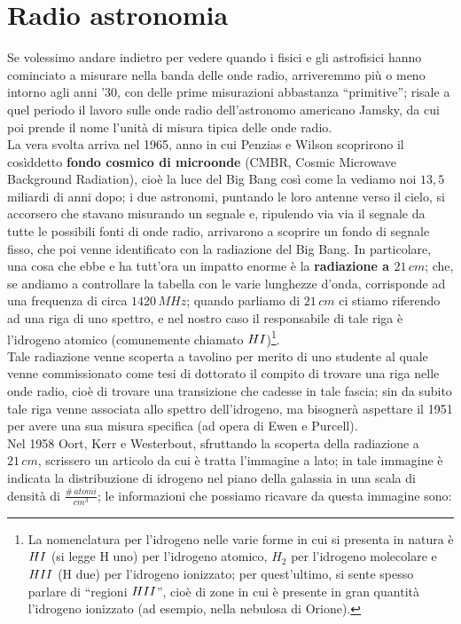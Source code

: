 \section{Radio astronomia}
Se volessimo andare indietro per vedere quando i fisici e gli astrofisici hanno cominciato a misurare nella banda delle onde radio, arriveremmo più o meno intorno agli anni '30, con delle prime misurazioni abbastanza ``primitive''; risale a quel periodo il lavoro sulle onde radio dell'astronomo americano Jamsky, da cui poi prende il nome l'unità di misura tipica delle onde radio.\\
La vera svolta arriva nel 1965, anno in cui Penzias e Wilson scoprirono il cosìddetto \textbf{fondo cosmico di microonde} (CMBR, Cosmic Microwave Background Radiation), cioè la luce del Big Bang così come la vediamo noi $13,5$ miliardi di anni dopo; i due astronomi, puntando le loro antenne verso il cielo, si accorsero che stavano misurando un segnale e, ripulendo via via il segnale da tutte le possibili fonti di onde radio, arrivarono a scoprire un fondo di segnale fisso, che poi venne identificato con la radiazione del Big Bang. In particolare, una cosa che ebbe e ha tutt'ora un impatto enorme è la \textbf{radiazione a $21 \, cm$}; che, se andiamo a controllare la tabella con le varie lunghezze d'onda, corrisponde ad una frequenza di circa $1420 \, MHz$; quando parliamo di $21 \, cm$ ci stiamo riferendo ad una riga di uno spettro, e nel nostro caso il responsabile di tale riga è l'idrogeno atomico (comunemente chiamato $H \RNum{1}$)\footnote{La nomenclatura per l'idrogeno nelle varie forme in cui si presenta in natura è $H \RNum{1}$ (si legge H uno) per l'idrogeno atomico, $H_2$ per l'idrogeno molecolare e $H \RNum{2}$ (H due) per l'idrogeno ionizzato; per quest'ultimo, si sente spesso parlare di ``regioni $H \RNum{2}$'', cioè di zone in cui è presente in gran quantità l'idrogeno ionizzato (ad esempio, nella nebulosa di Orione).}.\\
Tale radiazione venne scoperta a tavolino per merito di uno studente al quale venne commissionato come tesi di dottorato il compito di trovare una riga nelle onde radio, cioè di trovare una transizione che cadesse in tale fascia; sin da subito tale riga venne associata allo spettro dell'idrogeno, ma bisognerà aspettare il 1951 per avere una sua misura specifica (ad opera di Ewen e Purcell).\\
Nel 1958 Oort, Kerr e Westerbout, sfruttando la scoperta della radiazione a $21 \, cm$, scrissero un articolo da cui è tratta l'immagine a lato; in tale immagine è indicata la distribuzione di idrogeno nel piano della galassia in una scala di densità di $\frac{\# \, atomi}{cm^3}$; le informazioni che possiamo ricavare da questa immagine sono:\\
